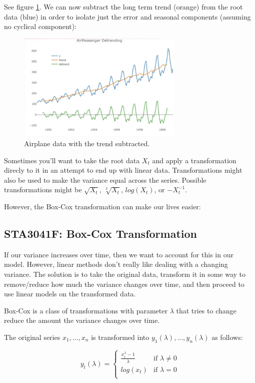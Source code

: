 \documentclass[12pt]{article}
\begin{document}
See figure \ref{fig:airplane_data_less_trend}. 
We can now subtract the long term trend (orange) from the root data (blue) 
in order to isolate just the error and seasonal components (assuming no 
cyclical component):
\begin{figure}[t]
    \centering
    \includegraphics[width=8cm]{airplane_data_less_trend}
    \caption{Airplane data with the trend subtracted.}
    \label{fig:airplane_data_less_trend}
\end{figure}

Sometimes you'll want to take the root data $X_t$ and apply a transformation direcly to it
in an attempt to end up with linear data. Transformations might also be used to make the variance equal across the series.
Possible transformations might be $\sqrt{X_t}$, $\sqrt[3]{X_t}$, $log(X_t)$, or $-X_t^{-1}$.

However, the Box-Cox transformation can make our lives easier:

\subsection{STA3041F: Box-Cox Transformation}
If our variance increases over time, then we want to account for this in our model. However, linear methods don't really like dealing with a changing variance. The solution is to take the original data, transform it in some way to remove/reduce how much the variance changes over time, and then proceed to use linear models on the transformed data.

Box-Cox is a class of transformations with parameter $\lambda$  that tries to change reduce the amount the variance changes over time.

The original series $x_1, \dots, x_n$ is transformed into $y_1(\lambda), \dots, y_n(\lambda)$ as follows:

\begin{equation*}
    y_t(\lambda) =
    \begin{cases}
        \frac{x_t^{\lambda} - 1}{\lambda}  & \text{if $\lambda \ne 0$} \\[2ex]
                                  log(x_t) & \text{if $\lambda = 0$} \\
    \end{cases}
\end{equation*}
\end{document}
